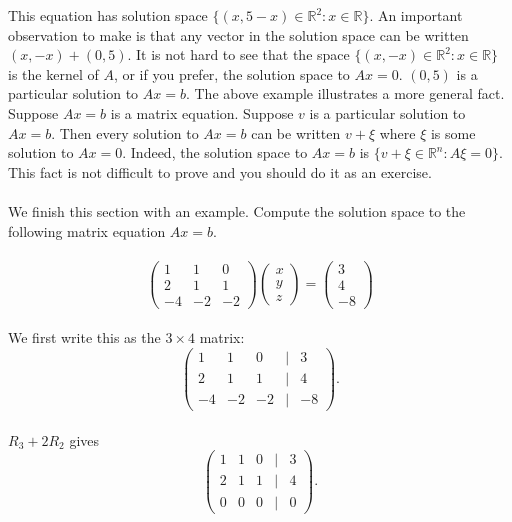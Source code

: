 \documentclass{amsart}
\begin{document}
 This equation has solution space $\{(x,5-x)\in\mathbb{R}^{2}:x\in\mathbb{R}\}$. An important observation to make is that any vector in the solution space can be written $(x,-x)+(0,5)$. It is not hard to see that the space $\{(x,-x)\in\mathbb{R}^{2}:x\in\mathbb{R}\}$ is the kernel of $A$, or if you prefer, the solution space to $Ax=0$. $(0,5)$ is a particular solution to $Ax=b$. The above example illustrates a more general fact. Suppose $Ax=b$ is a matrix equation. Suppose $v$ is a particular solution to $Ax=b$. Then every solution to $Ax=b$ can be written $v+\xi$ where $\xi$ is some solution to $Ax=0$. Indeed, the solution space to $Ax=b$ is $\{v+\xi\in\mathbb{R}^{n}:A\xi=0\}$. This fact is not difficult to prove and you should do it as an exercise.\\
\\
We finish this section with an example. Compute the solution space to the following matrix equation $Ax=b$.\\
\\
 \begin{equation*}
 \begin{pmatrix}
 1&1&0\\
 2&1&1\\
 -4&-2&-2
 \end{pmatrix}
 \begin{pmatrix}
 x\\
 y\\
 z
 \end{pmatrix}
=
\begin{pmatrix}
 3\\
 4\\
 -8
 \end{pmatrix}
\end{equation*}
\\
We first write this as the $3\times 4$ matrix:
\begin{equation*}
 \begin{pmatrix}
 1&1&0&|&3\\
 2&1&1&|&4\\
 -4&-2&-2&|&-8
 \end{pmatrix}.
\end{equation*}
\\
$R_{3}+2R_{2}$ gives
\begin{equation*}
 \begin{pmatrix}
 1&1&0&|&3\\
 2&1&1&|&4\\
 0&0&0&|&0
 \end{pmatrix}.
\end{equation*}
\end{document}
